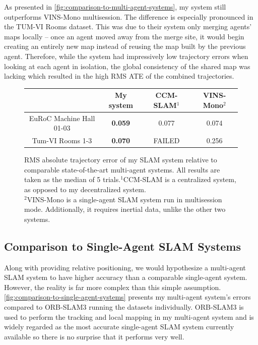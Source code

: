 As presented in \autoref{fig:comparison-to-multi-agent-systems}, my system still outperforms VINS-Mono multisession. The difference is especially pronounced in the TUM-VI Rooms dataset. This was due to their system only merging agents' maps locally – once an agent moved away from the merge site, it would begin creating an entirely new map instead of reusing the map built by the previous agent. Therefore, while the system had impressively low trajectory errors when looking at each agent in isolation, the global consistency of the shared map was lacking which resulted in the high RMS ATE of the combined trajectories.


\begin{figure}[h]
    \centering
    \def\arraystretch{1.2}
    \begin{tabular}{ |c|c|c|c| }
        \cline{2-4}
        \multicolumn{1}{c|}{}    & My system      & CCM-SLAM$^1$ & VINS-Mono$^2$ \\
        \hline
        EuRoC Machine Hall 01-03 & \textbf{0.059} & 0.077        & 0.074         \\
        \hline
        Tum-VI Rooms 1-3         & \textbf{0.070} & FAILED       & 0.256         \\
        \hline
    \end{tabular}

    \caption{RMS absolute trajectory error of my SLAM system relative to comparable state-of-the-art multi-agent systems. All results are taken as the median of 5 trials.\captionbreak $^1$CCM-SLAM is a centralized system, as opposed to my decentralized system. \\ $^2$VINS-Mono is a single-agent SLAM system run in multisession mode. Additionally, it requires inertial data, unlike the other two systems.}
    \label{fig:comparison-to-multi-agent-systems}
\end{figure}

\subsection{Comparison to Single-Agent SLAM Systems}
Along with providing relative positioning, we would hypothesize a multi-agent SLAM system to have higher accuracy than a comparable single-agent system. However, the reality is far more complex than this simple assumption. \autoref{fig:comparison-to-single-agent-systems} presents my multi-agent system's errors compared to ORB-SLAM3 running the datasets individually. ORB-SLAM3 is used to perform the tracking and local mapping in my multi-agent system and is widely regarded as the most accurate single-agent SLAM system currently available so there is no surprise that it performs very well.

